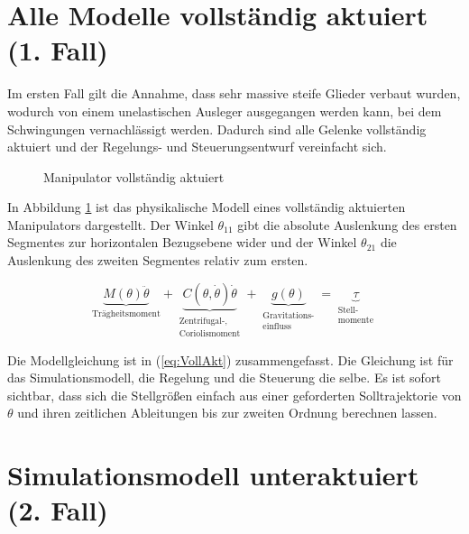 \section{Alle Modelle vollständig aktuiert (1. Fall)}

Im ersten Fall gilt die Annahme, dass sehr massive steife Glieder verbaut wurden, wodurch von einem unelastischen Ausleger ausgegangen werden kann, bei dem Schwingungen vernachlässigt werden. Dadurch sind alle Gelenke vollständig aktuiert und der Regelungs- und Steuerungsentwurf vereinfacht sich.

\begin{figure}[h]
	\centering
	
	\caption[]{Manipulator vollständig aktuiert}
	\label{fig:VollAkt}
\end{figure} 

In Abbildung \ref{fig:VollAkt} ist das physikalische Modell eines vollständig aktuierten Manipulators dargestellt. Der Winkel $\theta_{11}$ gibt die absolute Auslenkung des ersten Segmentes zur horizontalen Bezugsebene wider und der Winkel $\theta_{21}$ die Auslenkung des zweiten Segmentes relativ zum ersten.

\begin{equation} \label{eq:VollAkt}
\underbrace{M(\theta)\ddot{\theta}}_{\mbox{Trägheitsmoment}} + \underbrace{C(\theta,\dot{\theta})\dot{\theta}}_{\begin{matrix}
	\mbox{Zentrifugal-,} \\ \mbox{Coriolismoment} \end{matrix}}+\underbrace{g(\theta)}_{\begin{matrix}
	\mbox{Gravitations-} \\ \mbox{einfluss} \end{matrix}}=\underbrace{\tau}_{\begin{matrix}
	\mbox{Stell-} \\ \mbox{momente} \end{matrix}}
\end{equation}

Die Modellgleichung ist in (\ref{eq:VollAkt}) zusammengefasst. Die Gleichung ist für das Simulationsmodell, die Regelung und die Steuerung die selbe. Es ist sofort sichtbar, dass sich die Stellgrößen einfach aus einer geforderten Solltrajektorie von $\theta$ und ihren zeitlichen Ableitungen bis zur zweiten Ordnung berechnen lassen.

\section{Simulationsmodell unteraktuiert (2. Fall)}

